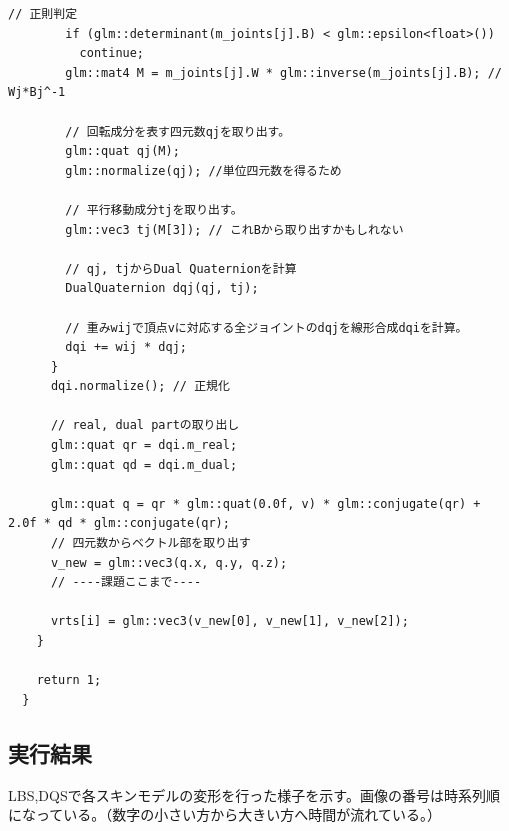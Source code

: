\documentclass[a4paper,10pt,uplatex,dvipdfmx]{jsarticle}
\begin{document}
\begin{lstlisting}[caption=characteranimation.cppのskinningDQS関数]
        // 正則判定
        if (glm::determinant(m_joints[j].B) < glm::epsilon<float>())
          continue;
        glm::mat4 M = m_joints[j].W * glm::inverse(m_joints[j].B); // Wj*Bj^-1
  
        // 回転成分を表す四元数qjを取り出す。
        glm::quat qj(M);
        glm::normalize(qj); //単位四元数を得るため
  
        // 平行移動成分tjを取り出す。
        glm::vec3 tj(M[3]); // これBから取り出すかもしれない
  
        // qj, tjからDual Quaternionを計算
        DualQuaternion dqj(qj, tj);
  
        // 重みwijで頂点vに対応する全ジョイントのdqjを線形合成dqiを計算。
        dqi += wij * dqj;
      }
      dqi.normalize(); // 正規化
  
      // real, dual partの取り出し
      glm::quat qr = dqi.m_real;
      glm::quat qd = dqi.m_dual;
  
      glm::quat q = qr * glm::quat(0.0f, v) * glm::conjugate(qr) + 2.0f * qd * glm::conjugate(qr);
      // 四元数からベクトル部を取り出す
      v_new = glm::vec3(q.x, q.y, q.z);
      // ----課題ここまで----
  
      vrts[i] = glm::vec3(v_new[0], v_new[1], v_new[2]);
    }
  
    return 1;
  }
\end{lstlisting}


\subsection{実行結果}
LBS,DQSで各スキンモデルの変形を行った様子を示す。画像の番号は時系列順になっている。（数字の小さい方から大きい方へ時間が流れている。）
\end{document}

